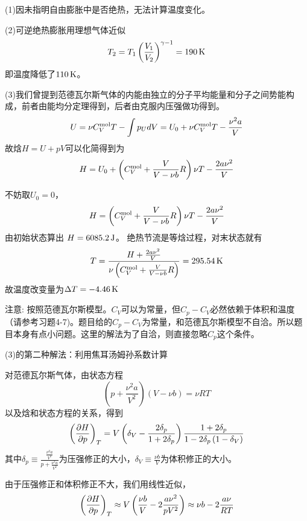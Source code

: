 \documentclass[CJK]{beamer}
\begin{document}
\begin{frame}
  \bch
  {\small
    (1)因未指明自由膨胀中是否绝热，无法计算温度变化。
    
    (2)可逆绝热膨胀用理想气体近似
  $$T_2 = T_1 \left(\frac{V_1}{V_2}\right)^{\gamma-1} = 190 \,\mathrm{K} $$
    即温度降低了$110\,\mathrm{K}$。
    
    (3)我们曾提到范德瓦尔斯气体的内能由独立的分子平均能量和分子之间势能构成，前者由能均分定理得到，后者由克服内压强做功得到。
    $$ U = \nu C_V^{\rm mol}T - \int p_U dV = U_0 + \nu C_V^{\rm mol}T - \frac{\nu^2 a}{V}$$
    故焓$H= U +pV$可以化简得到为
    $$ H  = U_0 + \left(C_V^{\rm mol} + \frac{V}{V-\nu b}R\right) \nu T -\frac{2a\nu^2}{V}$$
  }
  \ech
\end{frame}

\begin{frame}
  \bch
      {\small
        不妨取$U_0=0$，
    $$ H  = \left(C_V^{\rm mol} + \frac{V}{V-\nu b}R\right) \nu T -\frac{2a\nu^2}{V}$$
        由初始状态算出
        $H = 6085.2\,\mathrm{J}$。
        绝热节流是等焓过程，对末状态就有
        $$T = \frac{H+\frac{2a\nu^2}{V}}{\nu \left(C_V^{\rm mol}+ \frac{V}{V-\nu b}R\right)} = 295.54\,\mathrm{K} $$
        故温度改变量为$\Delta T = -4.46 \,\mathrm{K}$

        \skipline
        {\scriptsize
        注意: 按照范德瓦尔斯模型。$C_V$可以为常量，但$C_p-C_V$必然依赖于体积和温度（请参考习题4-7)。题目给的$C_p -C_V$为常量，和范德瓦尔斯模型不自洽。所以题目本身有点小问题。这里的解法为了自洽，则直接忽略$C_p$这个条件。}
      }
  \ech
\end{frame}
\begin{frame}
  \bch
      {\small
        (3)的第二种解法：利用焦耳汤姆孙系数计算

         对范德瓦尔斯气体，由状态方程
$$\left(p + \frac{\nu^2 a}{V^2}\right) \left(V - \nu b\right) = \nu RT$$
以及焓和状态方程的关系，得到
$$\left(\frac{\partial H}{\partial p}\right)_{T} = V \left(\delta_V - \frac{2\delta_p}{1+2\delta_p}\right) \frac{1+2\delta_p}{1-2\delta_p\left(1-\delta_V\right)}$$
其中$\delta_p \equiv \frac{\frac{\nu^2a}{V^2}}{p+\frac{\nu^2 a}{V^2}}$为压强修正的大小，$\delta_V\equiv \frac{\nu b}{V}$为体积修正的大小。
        
由于压强修正和体积修正不大，我们用线性近似，
        $$\left(\frac{\partial H}{\partial p}\right)_{T} \approx V\left(\frac{\nu b}{V} - 2\frac{a\nu^2}{pV^2}\right)\approx \nu b - 2\frac{a\nu}{RT}$$
      }

      \ech
\end{frame}
\end{document}
